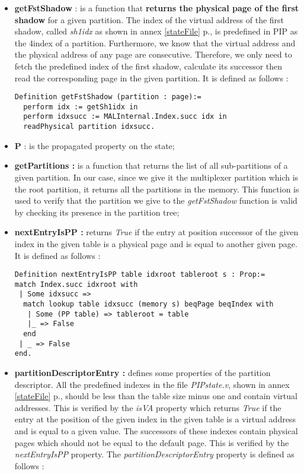 \begin{itemize}
	\item \textbf{getFstShadow} : is a function that \textbf{returns the physical page of the first shadow} for a given partition. The index of the virtual address of the first shadow, called \textit{sh1idx} as shown in annex \ref{stateFile} p.\pageref{stateFile}, is predefined in PIP as the 4\rth index of a partition. Furthermore, we know that the virtual address and the physical address of any page are consecutive. Therefore, we only need to fetch the predefined index of the first shadow, calculate its successor then read the corresponding page in the given partition. It is defined as follows :
\begin{lstlisting}[caption = {getFstShadow function in the shallow embedding},label={getFstShallow}]
Definition getFstShadow (partition : page):=
  perform idx := getSh1idx in
  perform idxsucc := MALInternal.Index.succ idx in
  readPhysical partition idxsucc.
\end{lstlisting} 
\vspace{4pt}
	\item \textbf{P} : is the propagated property on the state;
	\item \textbf{getPartitions :}  is a function that returns the list of all sub-partitions of a given partition. In our case, since we give it the multiplexer partition which is the root partition, it returns all the partitions in the memory. This function is used to verify that the partition we give to the \textit{getFstShadow} function is valid by checking its presence in the partition tree;
	\item \textbf{nextEntryIsPP :}  returns \textit{True} if the entry at position successor of the given index in the given table is a physical page and is equal to another given page. It is defined as follows :
\begin{lstlisting}[caption = {nextEntryIsPP property},mathescape=true, xleftmargin=-.1\textwidth, xrightmargin=-.05\textwidth,label={nextEnt}]
Definition nextEntryIsPP table idxroot tableroot s : Prop:= 
match Index.succ idxroot with 
 | Some idxsucc => 
  match lookup table idxsucc (memory s) beqPage beqIndex with 
   | Some (PP table) => tableroot = table
   |_ => False 
  end
 | _ => False 
end.
\end{lstlisting} 
	\item \textbf{partitionDescriptorEntry :}  defines some properties of the partition descriptor. All the predefined indexes in the file \textit{PIPstate.v}, shown in annex \ref{stateFile} p.\pageref{stateFile}, should be less than the table size minus one and contain virtual addresses. This is verified by the \textit{isVA} property which returns \textit{True} if the entry at the position of the given index in the given table is a virtual address and is equal to a given value. The successors of these indexes contain physical pages which should not be equal to the default page. This is verified by the \textit{nextEntryIsPP} property. The \textit{partitionDescriptorEntry} property is defined as follows :

\end{itemize}
